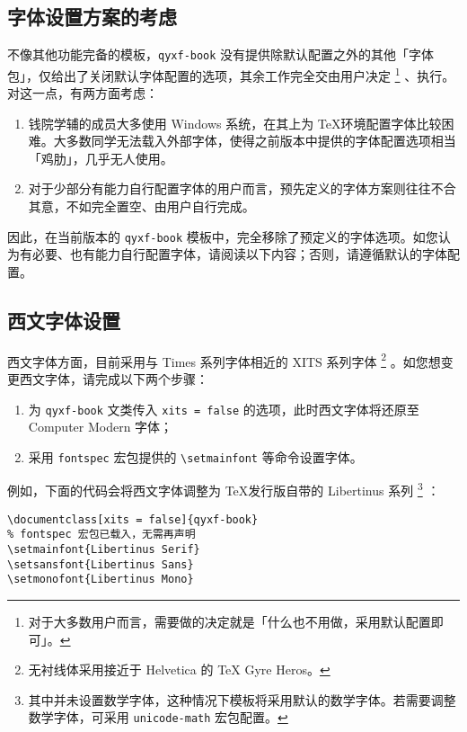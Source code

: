 \documentclass[
  10pt,
  twoside,
  openany,
  b5paper, %
  colorscheme = basic, %
]{qyxf-book}
\begin{document}
\subsection{字体设置方案的考虑}

不像其他功能完备的模板，\verb|qyxf-book| 没有提供除默认配置之外的其他「字体包」，仅给出了关闭默认字体配置的选项，其余工作完全交由用户决定
\footnote{对于大多数用户而言，需要做的决定就是「什么也不用做，采用默认配置即可」。}
、执行。对这一点，有两方面考虑：
\begin{enumerate}
  \item 钱院学辅的成员大多使用 Windows 系统，在其上为 \TeX 环境配置字体比较困难。大多数同学无法载入外部字体，使得之前版本中提供的字体配置选项相当「鸡肋」，几乎无人使用。
  \item 对于少部分有能力自行配置字体的用户而言，预先定义的字体方案则往往不合其意，不如完全置空、由用户自行完成。
\end{enumerate}
因此，在当前版本的 \verb|qyxf-book| 模板中，完全移除了预定义的字体选项。如您认为有必要、也有能力自行配置字体，请阅读以下内容；否则，请遵循默认的字体配置。

\subsection{西文字体设置}

西文字体方面，目前采用与 Times 系列字体相近的 XITS 系列字体
\footnote{无衬线体采用接近于 Helvetica 的 \TeX{} Gyre Heros。}
。如您想变更西文字体，请完成以下两个步骤：

\begin{enumerate}
  \item 为 \verb|qyxf-book| 文类传入 \verb|xits = false| 的选项，此时西文字体将还原至 Computer Modern 字体；
  \item 采用 \verb|fontspec| 宏包提供的 \verb|\setmainfont| 等命令设置字体。
\end{enumerate}

例如，下面的代码会将西文字体调整为 \TeX 发行版自带的 Libertinus 系列
\footnote{其中并未设置数学字体，这种情况下模板将采用默认的数学字体。若需要调整数学字体，可采用 \texttt{unicode-math} 宏包配置。}
：

\begin{tcolorbox}
\begin{verbatim}
\documentclass[xits = false]{qyxf-book}
% fontspec 宏包已载入，无需再声明
\setmainfont{Libertinus Serif}
\setsansfont{Libertinus Sans}
\setmonofont{Libertinus Mono}
\end{verbatim}
\end{tcolorbox}
\end{document}
